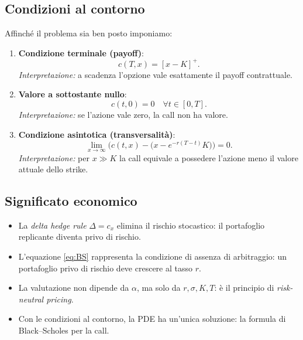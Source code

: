 \documentclass[12pt,a4paper]{book}
\theoremstyle{remark}
\begin{document}
\subsection{Condizioni al contorno}
Affinché il problema sia ben posto imponiamo:
\begin{enumerate}
  \item \textbf{Condizione terminale (payoff)}:
  \[
  c(T,x) = [x-K]^+.
  \]
  \emph{Interpretazione:} a scadenza l'opzione vale esattamente il payoff contrattuale.
  
  \item \textbf{Valore a sottostante nullo}:
  \[
  c(t,0)=0 \quad \forall t \in [0,T].
  \]
  \emph{Interpretazione:} se l'azione vale zero, la call non ha valore.
  
  \item \textbf{Condizione asintotica (transversalità)}:
  \[
  \lim_{x\to\infty} \Big( c(t,x) - \big(x - e^{-r(T-t)}K\big)\Big)=0.
  \]
  \emph{Interpretazione:} per $x \gg K$ la call equivale a possedere l'azione meno il valore attuale dello strike.
\end{enumerate}

\subsection{Significato economico}
\begin{itemize}
  \item La \emph{delta hedge rule} $\Delta=c_x$ elimina il rischio stocastico: il portafoglio replicante diventa privo di rischio.
  \item L'equazione \eqref{eq:BS} rappresenta la condizione di assenza di arbitraggio: un portafoglio privo di rischio deve crescere al tasso $r$.
  \item La valutazione non dipende da $\alpha$, ma solo da $r,\sigma,K,T$: è il principio di \emph{risk-neutral pricing}.
  \item Con le condizioni al contorno, la PDE ha un'unica soluzione: la formula di Black--Scholes per la call.
\end{itemize}
\end{document}
